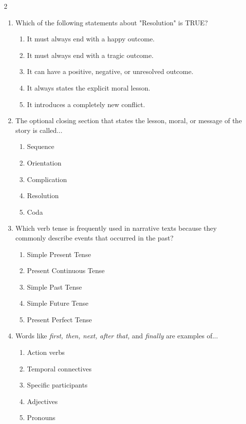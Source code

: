 \documentclass[10pt,a4paper]{article}
\begin{document}
\begin{multicols}{2}
\begin{enumerate}
    \item Which of the following statements about "Resolution" is TRUE?
    \begin{enumerate}
      \item It must always end with a happy outcome.
      \item It must always end with a tragic outcome.
      \item It can have a positive, negative, or unresolved outcome.
      \item It always states the explicit moral lesson.
      \item It introduces a completely new conflict.
    \end{enumerate}

    \item The optional closing section that states the lesson, moral, or message of the story is called...
    \begin{enumerate}
      \item Sequence
      \item Orientation
      \item Complication
      \item Resolution
      \item Coda
    \end{enumerate}

    \item Which verb tense is frequently used in narrative texts because they commonly describe events that occurred in the past?
    \begin{enumerate}
      \item Simple Present Tense
      \item Present Continuous Tense
      \item Simple Past Tense
      \item Simple Future Tense
      \item Present Perfect Tense
    \end{enumerate}

    \item Words like \textit{first, then, next, after that,} and \textit{finally} are examples of...
    \begin{enumerate}
      \item Action verbs
      \item Temporal connectives
      \item Specific participants
      \item Adjectives
      \item Pronouns
    \end{enumerate}


\end{enumerate}
\end{multicols}
\end{document}
